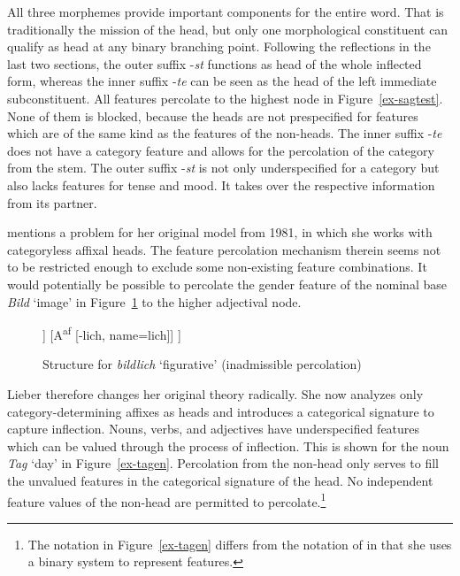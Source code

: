 \documentclass[output=paper
  ,nobabel
  ,draftmode
  ,colorlinks, citecolor=brown
]{langscibook}
\begin{document}
\largerpage
All three morphemes provide important components for the entire word. That is traditionally the mission of the head, but only one morphological constituent can qualify as head at any binary branching point. Following the reflections in the last two sections, the outer suffix -\emph{st} functions as head of the whole inflected form, whereas the inner suffix -\emph{te} can be seen as the head of the left immediate subconstituent. All features percolate to the highest node in Figure~\ref{ex-sagtest}. None of them is blocked, because the heads are not prespecified for features which are of the same kind as the features of the non-heads. The inner suffix -\emph{te} does not have a category feature and allows for the percolation of the category from the stem. The outer suffix -\emph{st} is not only underspecified for a category but also lacks features for tense and mood. It takes over the respective information from its partner.

\citet{Lieber1992} mentions a problem for her original model from 1981, in which she works with categoryless affixal heads. The feature percolation mechanism therein seems not to be restricted enough to exclude some non-existing feature combinations. It would potentially be possible to percolate the gender feature of the nominal base \emph{Bild} `image' in Figure~\ref{ex-bildlich} to the higher adjectival node.

\begin{figure}
\begin{forest}
	[$^{\ast}${[A, neut]}
		[{[N, neut]} [bild]]
		[A\textsuperscript{af} [-lich, name=lich]]
	]
\end{forest}
\caption{Structure for \emph{bildlich} `figurative' (inadmissible percolation)}\label{ex-bildlich}
\end{figure}


Lieber therefore changes her original theory radically. She now analyzes only category-determining affixes as heads and introduces a categorical signature to capture inflection. Nouns, verbs, and adjectives have underspecified features which can be valued through the process of inflection. This is shown for the noun \emph{Tag} `day' in Figure~\ref{ex-tagen}. Percolation from the non-head only serves to fill the unvalued features in the categorical signature of the head. No independent feature values of the non-head are permitted to percolate.\footnote{The notation in Figure~\ref{ex-tagen} differs from the notation of \citet{Lieber1992} in that she uses a binary system to represent features.}
\end{document}
